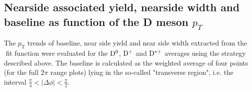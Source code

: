 
\subsection{Nearside associated yield, nearside width and baseline as function of the D meson $p_{T}$}


The $p_\mathrm{T}$ trends of baseline, near side yield and near side width extracted from the fit function were evaluated for the ${\rm D^0}$, ${\rm D^+}$ and ${\rm D^{*+}}$ averages using the strategy described above. The baseline is calculated as the weighted average of four points  (for the full 2$\pi$ range plots) lying in the so-called "transverse region", i.e. the interval $\frac{\pi}{4}<|\Delta\phi|<\frac{\pi}{2}$.

